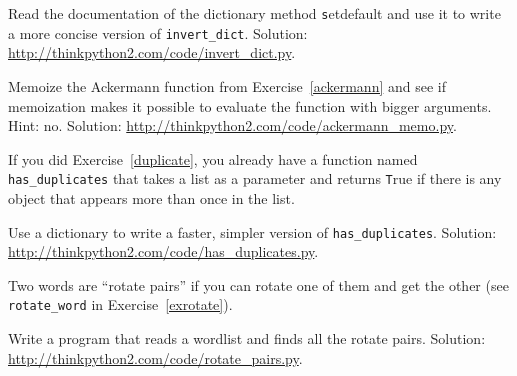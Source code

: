\documentclass[
DIV=11,
fontsize=12,
twoside,
headinclude=false,
titlepage=firstiscover,
abstract=true,
headsepline=true,
footsepline=true,
chapterprefix=true, %
headings=big,
bibliography=totoc,%
captions=tableheading
]{scrbook}
\theoremstyle{definition}
\begin{document}
\begin{exercise}
\normalfont
\label{setdefault}

Read the documentation of the dictionary method {\texttt setdefault}
and use it to write a more concise version of \verb"invert_dict".
Solution: \url{http://thinkpython2.com/code/invert_dict.py}.

\end{exercise}


\begin{exercise}
\normalfont
Memoize the Ackermann function from Exercise~\ref{ackermann} and see if
memoization makes it possible to evaluate the function with bigger
arguments.  Hint: no.
Solution: \url{http://thinkpython2.com/code/ackermann_memo.py}.

\end{exercise}



\begin{exercise}
\normalfont
{}

If you did Exercise~\ref{duplicate}, you already have
a function named \verb"has_duplicates" that takes a list
as a parameter and returns {\texttt True} if there is any object
that appears more than once in the list.

Use a dictionary to write a faster, simpler version of
\verb"has_duplicates". 
Solution: \url{http://thinkpython2.com/code/has_duplicates.py}.

\end{exercise}


\begin{exercise}
\normalfont
\label{exrotatepairs}

Two words are ``rotate pairs'' if you can rotate one of them
and get the other (see \verb"rotate_word" in Exercise~\ref{exrotate}).

Write a program that reads a wordlist and finds all the rotate
pairs.  Solution: \url{http://thinkpython2.com/code/rotate_pairs.py}.

\end{exercise}
\end{document}
